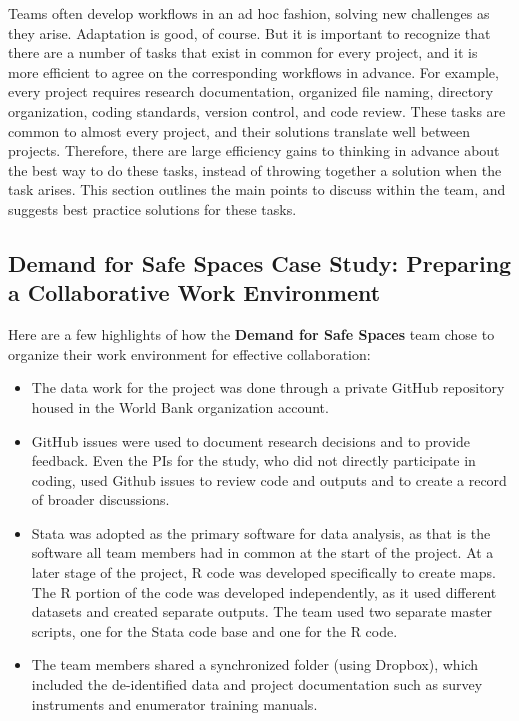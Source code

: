 \documentclass[
]{book}
\providecommand{\tightlist}{%
  \setlength{\itemsep}{0pt}\setlength{\parskip}{0pt}}
\begin{document}
Teams often develop workflows in an ad hoc fashion,
solving new challenges as they arise.
Adaptation is good, of course.
But it is important to recognize
that there are a number of tasks that exist in common for every project,
and it is more efficient to agree on the corresponding workflows in advance.
For example, every project requires
research documentation, organized file naming, directory organization,
coding standards, version control, and code review.
These tasks are common to almost every project,
and their solutions translate well between projects.
Therefore, there are large efficiency gains to
thinking in advance about the best way to do these tasks,
instead of throwing together a solution when the task arises.
This section outlines the main points to discuss within the team,
and suggests best practice solutions for these tasks.

\begin{ex}
\hypertarget{demand-for-safe-spaces-case-study-preparing-a-collaborative-work-environment}{%
\subsection*{Demand for Safe Spaces Case Study: Preparing a Collaborative Work Environment}\label{demand-for-safe-spaces-case-study-preparing-a-collaborative-work-environment}}

Here are a few highlights of how the \textbf{Demand for Safe Spaces} team chose to organize their work environment for effective collaboration:

\begin{itemize}
\tightlist
\item
  The data work for the project was done through a private GitHub repository housed in the World Bank organization account.
\item
  GitHub issues were used to document research decisions and to provide feedback. Even the PIs for the study, who did not directly participate in coding, used Github issues to review code and outputs and to create a record of broader discussions.
\item
  Stata was adopted as the primary software for data analysis, as that is the software all team members had in common at the start of the project. At a later stage of the project, R code was developed specifically to create maps. The R portion of the code was developed independently, as it used different datasets and created separate outputs. The team used two separate master scripts, one for the Stata code base and one for the R code.\\
\item
  The team members shared a synchronized folder (using Dropbox), which included the de-identified data and project documentation such as survey instruments and enumerator training manuals.
\end{itemize}
\end{ex}
\end{document}
